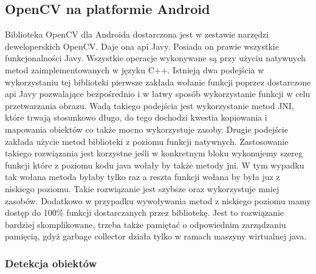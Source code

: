 \documentclass{article}
\numberwithin{equation}{section}
\begin{document}
\subsection{OpenCV na platformie Android}

Biblioteka OpenCV dla Androida dostarczona jest w zestawie narzędzi deweloperskich OpenCV. Daje ona api Javy. Posiada on prawie wszystkie funkcjonalności Javy. Wszystkie operacje wykonywane są przy użyciu natywnych metod zaimplementowanych w języku C++. Istnieją dwa podejścia w wykorzystaniu tej biblioteki pierwsze zakłada wołanie funkcji poprzez dostarczone api Javy pozwalające bezpośrednio i w łatwy sposób wykorzystanie funkcji w celu przetwarzania obrazu. Wadą takiego podejścia jest wykorzystanie metod JNI, które trwają stosunkowo długo, do tego dochodzi kwestia kopiowania i mapowania obiektów co także mocno wykorzystuje zasoby. Drugie podejście zakłada użycie metod biblioteki z poziomu funkcji natywnych. Zastosowanie takiego rozwiązania jest korzystne jeśli w konkretnym bloku wykonujemy szereg funkcji które z poziomu kodu java wołały by także metody jni. W tym wypadku tak wołana metoda byłaby tylko raz a reszta funkcji wołana by była juz z niskiego poziomu. Takie rozwiązanie jest szybsze oraz wykorzystuje mniej zasobów. Dodatkowo w przypadku wywoływania metod z niskiego poziomu mamy dostęp do 100\% funkcji dostarczanych przez bibliotekę. Jest to rozwiązanie bardziej skomplikowane, trzeba także pamiętać o odpowiednim zarządzaniu pamięcią, gdyż garbage collector działa tylko w ramach maszyny wirtualnej java.

\subsubsection{Detekcja obiektów}
\end{document}
